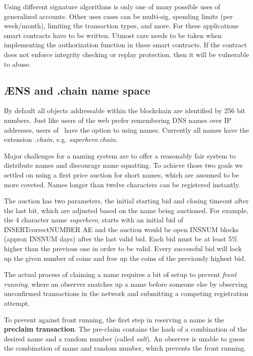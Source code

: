 Using different signature algorithms is only one of many possible uses
of generalized accounts. Other uses cases can be multi-sig, spending
limits (per week/month), limiting the transaction types, and more. For
these applications smart contracts have to be written. Utmost care
needs to be taken when implementing the authorization
function in these smart contracts. If the contract does not enforce
integrity checking or replay protection, then it will be vulnerable to
abuse.



\subsection{ÆNS and .chain name space}
\label{sect:aens}

By default all objects addressable within the blockchain are identified by
256 bit numbers. Just like users of the web prefer remembering DNS names over
IP addresses, users of \aet\ have the option to using names. Currently all
names have the extension \textit{.chain}, e.g. \textit{superhero.chain}.

Major challenges for a naming system are to offer a reasonably fair system to
distribute names and discourage name squatting. To achieve those two goals we
settled on using a first price auction for short names, which are assumed to be
more coveted. Names longer than twelve characters can be registered instantly.

The auction has two parameters, the initial starting bid and closing timeout
after the last bit, which are adjusted based on the name being auctioned.
For example, the 4 character name \textit{superhero}, starts with an initial
bid of INSERTcorrectNUMBER AE and the auction would be open INSNUM blocks
(approx INSNUM
days) after the last valid bid.
Each bid must be at least 5\% higher than the previous one in order to be
valid. Every successful bid will lock up the given number of coins and free
up the coins of the previously highest bid.

The actual process of claiming a name requires a bit of setup to prevent
\textit{front running}, where an observer snatches up a name before someone
else by observing unconfirmed transactions in the network and submitting a
competing registration attempt.

To prevent against front running, the first step in reserving a name is the
\textbf{preclaim transaction}. The pre-claim contains the hash of a combination
of the desired name and a random number (called \textit{salt}). An observer is
unable to guess the combination of name and random number, which prevents the
front running.

